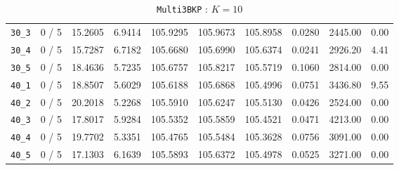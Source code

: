 \begin{table}[h!]
\begin{center}
\begin{tabular}{| c | c | c | c | c | c | c | c | c | c |}
\verb|30_3| & 0 / 5 & 15.2605 & 6.9414 & 105.9295 & 105.9673 & 105.8958 & 0.0280 & 2445.00 & 0.00\\ 
\verb|30_4| & 0 / 5 & 15.7287 & 6.7182 & 105.6680 & 105.6990 & 105.6374 & 0.0241 & 2926.20 & 4.41\\ 
\verb|30_5| & 0 / 5 & 18.4636 & 5.7235 & 105.6757 & 105.8217 & 105.5719 & 0.1060 & 2814.00 & 0.00\\ 
\verb|40_1| & 0 / 5 & 18.8507 & 5.6029 & 105.6188 & 105.6868 & 105.4996 & 0.0751 & 3436.80 & 9.55\\ 
\verb|40_2| & 0 / 5 & 20.2018 & 5.2268 & 105.5910 & 105.6247 & 105.5130 & 0.0426 & 2524.00 & 0.00\\ 
\verb|40_3| & 0 / 5 & 17.8017 & 5.9284 & 105.5352 & 105.5859 & 105.4521 & 0.0471 & 4213.00 & 0.00\\ 
\verb|40_4| & 0 / 5 & 19.7702 & 5.3351 & 105.4765 & 105.5484 & 105.3628 & 0.0756 & 3091.00 & 0.00\\ 
\verb|40_5| & 0 / 5 & 17.1303 & 6.1639 & 105.5893 & 105.6372 & 105.4978 & 0.0525 & 3271.00 & 0.00\\ 
\hline
\end{tabular}
\caption{\texttt{Multi3BKP} : $K = 10$}
\label{table:}
\end{center}
\end{table}


